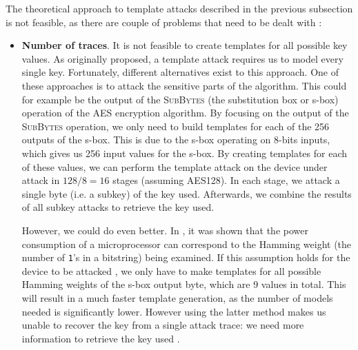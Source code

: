 The theoretical approach to template attacks described in the previous subsection is not feasible, as there are couple of problems that need to be dealt with \cite{rechberger2004practical, whisperer2018template}:
%
\begin{itemize}
	\item \textbf{Number of traces}. It is not feasible to create templates for all possible key values. 
	As originally proposed, a template attack requires us to model every single key. 
	Fortunately, different alternatives exist to this approach. 
	One of these approaches is to attack the sensitive parts of the algorithm.
	This could for example be the output of the \textsc{SubBytes} (the substitution box or s-box) operation of the AES encryption algorithm. 
	By focusing on the output of the \textsc{SubBytes} operation, we only need to build templates for each of the 256 outputs of the s-box. 
	This is due to the s-box operating on 8-bits inputs, which gives us 256 input values for the s-box.
	By creating templates for each of these values, we can perform the template attack on the device under attack in $128/8 = 16$ stages (assuming AES128).
	In each stage, we attack a single byte (i.e. a subkey) of the key used.
	Afterwards, we combine the results of all subkey attacks to retrieve the key used.
	
	However, we could do even better. In \cite{brier2004correlation}, it was shown that the power consumption of a microprocessor can correspond to the Hamming weight (the number of \texttt{1}'s in a bitstring) being examined.
	If this assumption holds for the device to be attacked , we only have to make templates for all possible Hamming weights of the s-box output byte, which are 9 values in total.
	This will result in a much faster template generation, as the number of models needed is significantly lower.
	However using the latter method makes us unable to recover the key from a single attack trace: we need more information to retrieve the key used \cite{whisperer2018template}.
	

\end{itemize}
